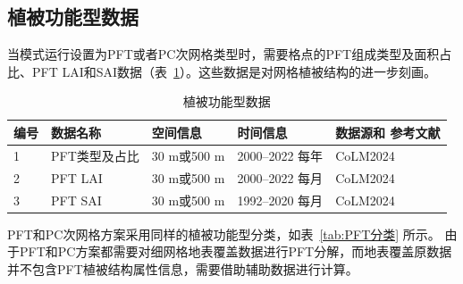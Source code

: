 \subsection{植被功能型数据}\label{植被功能型数据}

当模式运行设置为PFT或者PC次网格类型时，需要格点的PFT组成类型及面积占比、PFT LAI和SAI数据（表~\ref{tab:PFT数据}）。这些数据是对网格植被结构的进一步刻画。

\begin{table}[htbp]
  \begin{threeparttable}
    \centering
    \caption{植被功能型数据}
    \label{tab:PFT数据}
    \begin{tabular}{p{1cm}p{3.5cm}p{3cm}p{3cm}p{3cm}}
      \toprule
      编号 & 数据名称      & 空间信息    & 时间信息                 & 数据源和 \newline 参考文献 \\
      \midrule
      1    & PFT类型及占比 & 30 m或500 m & 2000--2022 \newline 每年 & CoLM2024                   \\
      2    & PFT LAI       & 30 m或500 m & 2000--2022 \newline 每月 & CoLM2024                   \\
      3    & PFT SAI       & 30 m或500 m & 1992--2020 \newline 每月 & CoLM2024                   \\
      \bottomrule
    \end{tabular}
  \end{threeparttable}
\end{table}

PFT和PC次网格方案采用同样的植被功能型分类，如表~\ref{tab:PFT分类} 所示。
由于PFT和PC方案都需要对细网格地表覆盖数据进行PFT分解，而地表覆盖原数据并不包含PFT植被结构属性信息，需要借助辅助数据进行计算。

